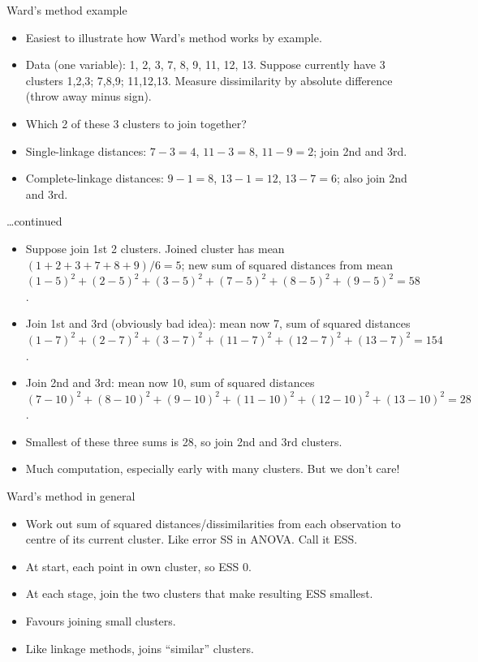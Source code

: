 \documentclass[pdf]{prosper}
\begin{document}
\begin{slide}{Ward's method example}

  \begin{itemize}
  \item Easiest to illustrate how Ward's method works by example.
  \item Data (one variable): 1, 2, 3, 7, 8, 9, 11, 12, 13. Suppose currently have 3 clusters 1,2,3; 7,8,9; 11,12,13. Measure dissimilarity by absolute difference (throw away minus sign).
  \item Which 2 of these 3 clusters to join together?
  \item Single-linkage distances: $7-3=4$, $11-3=8$, $11-9=2$; join 2nd and 3rd.
  \item Complete-linkage distances: $9-1=8$, $13-1=12$, $13-7=6$; also join 2nd and 3rd.
\end{itemize}
\end{slide}

\begin{slide}{\ldots continued}
\begin{itemize}
  \item Suppose join 1st 2 clusters. Joined cluster has mean $(1+2+3+7+8+9)/6=5$; new sum of squared distances from mean $(1-5)^2+(2-5)^2+(3-5)^2+(7-5)^2+(8-5)^2+(9-5)^2=58$.
  \item Join 1st and 3rd (obviously bad idea): mean now 7, sum of squared distances $(1-7)^2+(2-7)^2+(3-7)^2+(11-7)^2+(12-7)^2+(13-7)^2=154$.
  \item Join 2nd and 3rd: mean now 10, sum of squared distances $(7-10)^2+(8-10)^2+(9-10)^2+(11-10)^2+(12-10)^2+(13-10)^2=28$.
  \item Smallest of these three sums is 28, so join 2nd and 3rd clusters.
  \item Much computation, especially early with many clusters. But we don't care!
  \end{itemize}
  
\end{slide}

\begin{slide}{Ward's method in general}

  \begin{itemize}
  \item Work out sum of squared distances/dissimilarities from each observation to centre of its current cluster. Like error SS in ANOVA. Call it ESS.
  \item At start, each point in own cluster, so ESS 0.
  \item At each stage, join the two clusters that make resulting ESS smallest.
  \item Favours joining small clusters.
  \item Like linkage methods, joins ``similar'' clusters.
  \end{itemize}
  
\end{slide}
\end{document}
